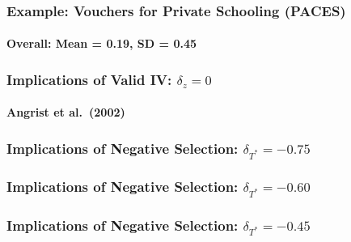 \documentclass{beamer}
\begin{document}
\begin{frame}
  \frametitle{Example: Vouchers for Private Schooling (PACES)}
  \framesubtitle{Overall: Mean = 0.19, SD = 0.45}
\begin{figure}[h]
  \scriptsize
  \begingroup
  \centering
  
  \endgroup
\end{figure}
\end{frame}
\begin{frame}
  \frametitle{Implications of Valid IV: $\delta_z = 0$}
  \framesubtitle{Angrist et al.\ (2002)}
\begin{figure}[h]
  \scriptsize
  \begingroup
  \centering
  
  \endgroup
\end{figure}
\end{frame}
\begin{frame}[noframenumbering]
  \frametitle{Implications of Negative Selection: $\delta_{T^*} = -0.75$}
\begin{figure}[h]
  \scriptsize
  \begingroup
  \centering
  
  \endgroup
\end{figure}
\end{frame}
\begin{frame}[noframenumbering]
  \frametitle{Implications of Negative Selection: $\delta_{T^*} = -0.60$}
\begin{figure}[h]
  \scriptsize
  \begingroup
  \centering
  
  \endgroup
\end{figure}
\end{frame}
\begin{frame}[noframenumbering]
  \frametitle{Implications of Negative Selection: $\delta_{T^*} = -0.45$}
\begin{figure}[h]
  \scriptsize
  \begingroup
  \centering
  
  \endgroup
\end{figure}
\end{frame}
\end{document}
